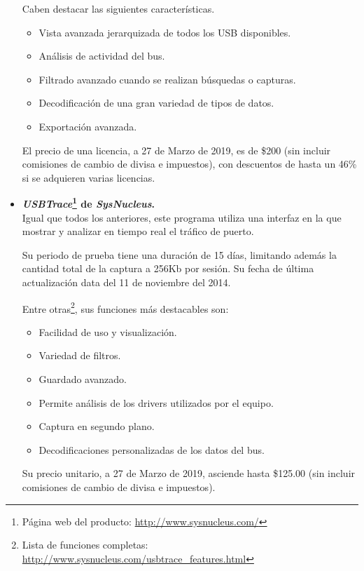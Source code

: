 \begin{itemize}
    Caben destacar las siguientes características.

    \begin{itemize}
        \item Vista avanzada jerarquizada de todos los USB disponibles.
        \item Análisis de actividad del bus.
        \item Filtrado avanzado cuando se realizan búsquedas o capturas.
        \item Decodificación de una gran variedad de tipos de datos.
        \item Exportación avanzada.
    \end{itemize}
    El precio de una licencia, a 27 de Marzo de 2019, es de \$200 (sin incluir comisiones de cambio de divisa e impuestos), con descuentos de hasta un 46\% si se adquieren varias licencias.

    \item \textbf{\emph{USBTrace}\footnote{Página web del producto: \url{http://www.sysnucleus.com/}} de \emph{SysNucleus}.} \\
    Igual que todos los anteriores, este programa utiliza una interfaz en la que mostrar y analizar en tiempo real el tráfico de puerto.

    Su periodo de prueba tiene una duración de 15 días, limitando además la cantidad total de la captura a 256Kb por sesión. Su fecha de última actualización data del 11 de noviembre del 2014.

    Entre otras\footnote{Lista de funciones completas: \url{http://www.sysnucleus.com/usbtrace_features.html}}, sus funciones más destacables son:
    \begin{itemize}
        \item Facilidad de uso y visualización.
        \item Variedad de filtros.
        \item Guardado avanzado.
        \item Permite análisis de los drivers utilizados por el equipo. 
        \item Captura en segundo plano.
        \item Decodificaciones personalizadas de los datos del bus.
    \end{itemize}
    Su precio unitario, a 27 de Marzo de 2019, asciende hasta \$125.00 (sin incluir comisiones de cambio de divisa e impuestos).
\end{itemize}

